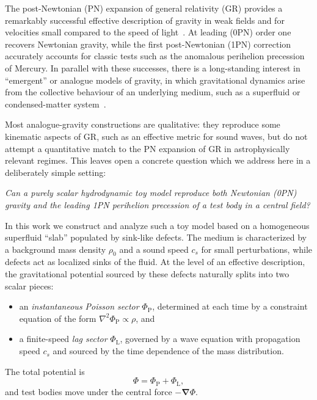 \documentclass[11pt]{article}
\newcommand{\cS}{c_s}
\newcommand{\PhiP}{\Phi_{\mathrm{P}}}
\newcommand{\PhiL}{\Phi_{\mathrm{L}}}
\newcommand{\PhiTot}{\Phi}
\begin{document}
The post-Newtonian (PN) expansion of general relativity (GR) provides a remarkably successful effective description of gravity in weak fields and for velocities small compared to the speed of light~\cite{Will:2014kxa,Blanchet:2013haa}. At leading (0PN) order one recovers Newtonian gravity, while the first post-Newtonian (1PN) correction accurately accounts for classic tests such as the anomalous perihelion precession of Mercury. In parallel with these successes, there is a long-standing interest in ``emergent'' or analogue models of gravity, in which gravitational dynamics arise from the collective behaviour of an underlying medium, such as a superfluid or condensed-matter system~\cite{Unruh:1980cg,Barcelo:2005fc,Volovik:2003fe}. 

Most analogue-gravity constructions are qualitative: they reproduce some kinematic aspects of GR, such as an effective metric for sound waves, but do not attempt a quantitative match to the PN expansion of GR in astrophysically relevant regimes. This leaves open a concrete question which we address here in a deliberately simple setting:

\medskip
\emph{Can a purely scalar hydrodynamic toy model reproduce both Newtonian (0PN) gravity and the leading 1PN perihelion precession of a test body in a central field?}
\medskip

In this work we construct and analyze such a toy model based on a homogeneous superfluid ``slab'' populated by sink-like defects. The medium is characterized by a background mass density $\rho_0$ and a sound speed $\cS$ for small perturbations, while defects act as localized sinks of the fluid. At the level of an effective description, the gravitational potential sourced by these defects naturally splits into two scalar pieces:
\begin{itemize}
  \item an \emph{instantaneous Poisson sector} $\PhiP$, determined at each time by a constraint equation of the form $\nabla^2 \PhiP \propto \rho$, and
  \item a finite-speed \emph{lag sector} $\PhiL$, governed by a wave equation with propagation speed $\cS$ and sourced by the time dependence of the mass distribution.
\end{itemize}
The total potential is
\begin{equation}
  \PhiTot = \PhiP + \PhiL,
\end{equation}
and test bodies move under the central force $-\bm{\nabla} \PhiTot$.
\end{document}
